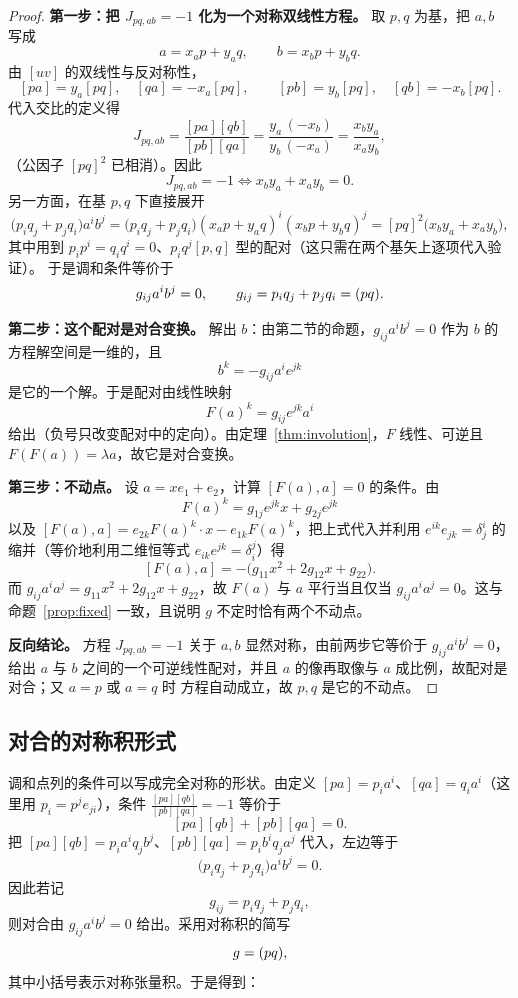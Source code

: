 \begin{proof}
\textbf{第一步：把 $J_{pq,ab}=-1$ 化为一个对称双线性方程。}
取 $p,q$ 为基，把 $a,b$ 写成
\[
a=x_ap+y_aq,\qquad b=x_bp+y_bq .
\]
由 $[uv]$ 的双线性与反对称性，
\[
[pa]=y_a[pq],\quad [qa]=-x_a[pq],\qquad
[pb]=y_b[pq],\quad [qb]=-x_b[pq].
\]
代入交比的定义得
\[
J_{pq,ab}=\frac{[pa][qb]}{[pb][qa]}
=\frac{y_a\,(-x_b)}{y_b\,(-x_a)}=\frac{x_by_a}{x_ay_b},
\]
（公因子 $[pq]^2$ 已相消）。因此
\[
J_{pq,ab}=-1 \iff x_by_a+x_ay_b=0 .
\]
另一方面，在基 $p,q$ 下直接展开
\[
\bigl(p_iq_j+p_jq_i\bigr)a^ib^j
=\bigl(p_iq_j+p_jq_i\bigr)(x_ap+y_aq)^i(x_bp+y_bq)^j
=[pq]^2\bigl(x_by_a+x_ay_b\bigr),
\]
其中用到 $p_ip^i=q_iq^i=0$、$p_iq^j[p,q]$ 型的配对（这只需在两个基矢上逐项代入验证）。
于是调和条件等价于
\[
g_{ij}a^ib^j=0,\qquad g_{ij}=p_iq_j+p_jq_i=(pq).
\]

\textbf{第二步：这个配对是对合变换。}
解出 $b$：由第二节的命题，$g_{ij}a^ib^j=0$ 作为 $b$ 的方程解空间是一维的，且
\[
b^k=-g_{ij}a^ie^{jk}
\]
是它的一个解。于是配对由线性映射
\[
F(a)^k=g_{ij}e^{jk}a^i
\]
给出（负号只改变配对中的定向）。由定理~\ref{thm:involution}，$F$ 线性、可逆且
$F(F(a))=\lambda a$，故它是对合变换。

\textbf{第三步：不动点。}
设 $a=xe_1+e_2$，计算 $[F(a),a]=0$ 的条件。由
\[
F(a)^k=g_{1j}e^{jk}x+g_{2j}e^{jk}
\]
以及 $[F(a),a]=e_{2k}F(a)^k\cdot x-e_{1k}F(a)^k$，把上式代入并利用 $e^{ik}e_{jk}=\delta^i_j$
的缩并（等价地利用二维恒等式 $e_{ik}e^{jk}=\delta^j_i$）得
\[
[F(a),a]=-\bigl(g_{11}x^2+2g_{12}x+g_{22}\bigr).
\]
而 $g_{ij}a^ia^j=g_{11}x^2+2g_{12}x+g_{22}$，故 $F(a)$ 与 $a$ 平行当且仅当
$g_{ij}a^ia^j=0$。这与命题~\ref{prop:fixed} 一致，且说明 $g$ 不定时恰有两个不动点。

\textbf{反向结论。}
方程 $J_{pq,ab}=-1$ 关于 $a,b$ 显然对称，由前两步它等价于 $g_{ij}a^ib^j=0$，给出 $a$ 与 $b$
之间的一个可逆线性配对，并且 $a$ 的像再取像与 $a$ 成比例，故配对是对合；又 $a=p$ 或 $a=q$ 时
方程自动成立，故 $p,q$ 是它的不动点。
\end{proof}

\subsection{对合的对称积形式}

调和点列的条件可以写成完全对称的形状。由定义 $[pa]=p_ia^i$、$[qa]=q_ia^i$（这里用
$p_i=p^je_{ji}$），条件 $\frac{[pa][qb]}{[pb][qa]}=-1$ 等价于
\[
[pa][qb]+[pb][qa]=0 .
\]
把 $[pa][qb]=p_ia^iq_jb^j$、$[pb][qa]=p_ib^iq_ja^j$ 代入，左边等于
\[
\bigl(p_iq_j+p_jq_i\bigr)a^ib^j=0 .
\]
因此若记
\[
g_{ij}=p_iq_j+p_jq_i ,
\]
则对合由 $g_{ij}a^ib^j=0$ 给出。采用对称积的简写
\[
g=(pq),
\]
其中小括号表示对称张量积。于是得到：


